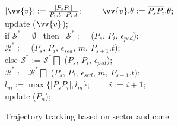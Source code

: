 \begin{figure}[tb!]
\begin{center}
{\begin{minipage}{3.3in}
{					\icc \>\hspace{7ex}    $|\vv{v}|:=\frac{|P_sP_{i}|}{P_{i}.t-P_s.t}$; ~~~~$\vv{v}.\theta:=\overline{P_sP_{i}}.\theta$; \\
					\icc \>\hspace{7ex}    update ($\vv{v}$); \\
					\icc \>\hspace{3ex} if $\mathcal{S}^*=\emptyset$ ~then~ $\mathcal{S}^*:=$ ($P_s$, $P_{i}$, $\epsilon_{ped}$);\\
					\icc \>\hspace{7ex}     $\mathcal{R}^*:=$ ($P_s$, $P_{i}$, $\epsilon_{sed}$, $m$, $P_{s+1}.t$); \\
					\icc \>\hspace{3ex} else $\mathcal{S}^*$ := $\mathcal{S}^*\bigsqcap$ ($P_s$, $P_{i}$, $\epsilon_{ped}$); \\
					\icc \>\hspace{7ex}     $\mathcal{R}^*:=\mathcal{R}^*\bigsqcap$ ($P_s$, $P_{i}$, $\epsilon_{sed}$, $m$, $P_{s+1}.t$);\\
					\icc \>\hspace{3ex} $l_{m} := \max\{|P_sP_{i}|, l_{m}\}$;  ~~~~$i$ := $i +1$;\\
					\icc \>\hspace{0ex} update ($P_{n}$); 
				}
				\vspace{-2ex}
				\myhrule
			\end{minipage}
		}
	\end{center}
	\vspace{-2ex}
	\caption{\small Trajectory tracking based on sector and cone.}
	\label{alg:bitt}
	\vspace{-1ex}
\end{figure}

